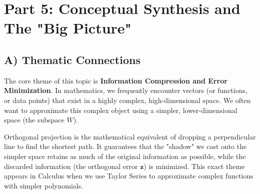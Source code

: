 \documentclass[11pt, letterpaper]{article}
\theoremstyle{definition}
\theoremstyle{remark}
\begin{document}
\begin{center}
\end{center}

\newpage
\section{Part 5: Conceptual Synthesis and The "Big Picture"}

\subsection{A) Thematic Connections}
The core theme of this topic is \textbf{Information Compression and Error Minimization}. In mathematics, we frequently encounter vectors (or functions, or data points) that exist in a highly complex, high-dimensional space. We often want to approximate this complex object using a simpler, lower-dimensional space (the subspace $W$). 

Orthogonal projection is the mathematical equivalent of dropping a perpendicular line to find the shortest path. It guarantees that the "shadow" we cast onto the simpler space retains as much of the original information as possible, while the discarded information (the orthogonal error $\mathbf{z}$) is minimized. This exact theme appears in Calculus when we use Taylor Series to approximate complex functions with simpler polynomials.
\end{document}
